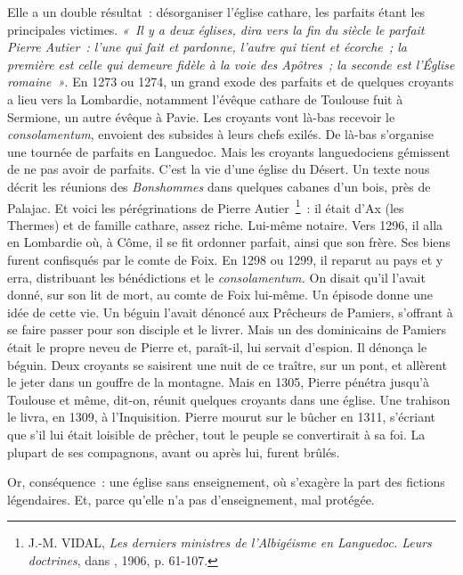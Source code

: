 \documentclass[french,twoside]{book} %
\begin{document}
\noindent Elle a un double résultat : désorganiser l’église cathare, les parfaits étant les principales victimes. \emph{« Il y a deux églises, dira vers la fin du siècle le parfait Pierre Autier : l’une qui fait et pardonne, l’autre qui tient et écorche ; la première est celle qui demeure fidèle à la voie des Apôtres ; la seconde est l’Église romaine »}. En 1273 ou 1274, un grand exode des parfaits et de quelques croyants a lieu vers la Lombardie, notamment l’évêque cathare de Toulouse fuit à Sermione, un autre évêque à Pavie. Les croyants vont là-bas recevoir le {\itshape consolamentum}, envoient des subsides à leurs chefs exilés. De là-bas s’organise une tournée de parfaits en Languedoc. Mais les croyants languedociens gémissent de ne pas avoir de parfaits. C’est la vie d’une église du Désert. Un texte nous décrit les réunions des {\itshape Bonshommes} dans quelques cabanes d’un bois, près de Palajac. Et voici les pérégrinations de Pierre Autier \footnote{ J.-M. VIDAL, {\itshape Les derniers ministres de l’Albigéisme en Languedoc. Leurs doctrines}, dans \href{http://gallica.bnf.fr/document?O=N016999}{}, 1906, p. 61-107.} : il était d’Ax (les Thermes) et de famille cathare, assez riche. Lui-même notaire. Vers 1296, il alla en Lombardie où, à Côme, il se fit ordonner parfait, ainsi que son frère. Ses biens furent confisqués par le comte de Foix. En 1298 ou 1299, il reparut au pays et y erra, distribuant les bénédictions et le {\itshape consolamentum.} On disait qu’il l’avait donné, sur son lit de mort, au comte de Foix lui-même. Un épisode donne une idée de cette vie. Un béguin l’avait dénoncé aux Prêcheurs de Pamiers, s’offrant à se faire passer pour son disciple et le livrer. Mais un des dominicains de Pamiers était le propre neveu de Pierre et, paraît-il, lui servait d’espion. Il dénonça le béguin. Deux croyants se saisirent une nuit de ce traître, sur un pont, et allèrent le jeter dans un gouffre de la montagne. Mais en 1305, Pierre pénétra jusqu’à Toulouse et même, dit-on, réunit quelques croyants dans une église. Une trahison le livra, en 1309, à l’Inquisition. Pierre mourut sur le bûcher en 1311, s’écriant que s’il lui était loisible de prêcher, tout le peuple se convertirait à sa foi. La plupart de ses compagnons, avant ou après lui, furent brûlés.\par
Or, conséquence : une église sans enseignement, où s’exagère la part des fictions légendaires. Et, parce qu’elle n’a pas d’enseignement, mal protégée.\par
\end{document}
